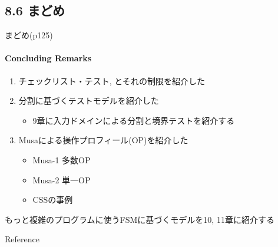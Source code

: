 \subsection{8.6 まどめ}
\begin{frame}{まどめ(p125)}
\framesubtitle{Concluding Remarks}
\begin{enumerate}
\item チェックリスト・テスト, とそれの制限を紹介した
\item 分割に基づくテストモデルを紹介した
    \begin{itemize}
    \item 9章に入力ドメインによる分割と境界テストを紹介する
    \end{itemize}
\item Musaによる操作プロフィール(OP)を紹介した
    \begin{itemize}
    \item Musa-1 多数OP
    \item Musa-2 単一OP
    \item CSSの事例
    \end{itemize}
\end{enumerate}
もっと複雑のプログラムに使うFSMに基づくモデルを10, 11章に紹介する
\end{frame}

\appendix
\backupbegin
\begin{frame}{Reference}



\end{frame}
\backupend

